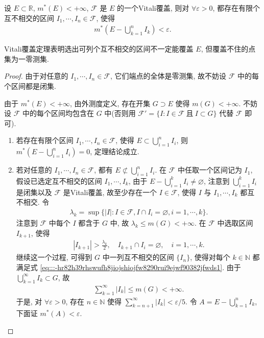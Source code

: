 \documentclass[../../main.tex]{subfiles}%
\begin{document}
\begin{theorem}[Vitali覆盖定理]\label{theorem:Vitali覆盖定理--实变函数}
设 $E\subset\mathbb{R}$, $m^*(E)<+\infty$, $\mathcal{F}$ 是 $E$ 的一个Vitali覆盖, 则对 $\forall\varepsilon>0$, 都存在有限个互不相交的区间 $I_1,\cdots,I_n\in\mathcal{F}$, 使得
\begin{align*}
m^*\!\left(E-\bigcup_{k=1}^n I_k\right)<\varepsilon.
\end{align*}
\end{theorem}
\begin{remark}
Vitali覆盖定理表明选出可列个互不相交的区间不一定能覆盖 $E$, 但覆盖不住的点集为一零测集.
\end{remark}
\begin{proof}

由于对任意的 $I_1,\cdots,I_n\in\mathcal{F}$, 它们端点的全体是零测集, 故不妨设 $\mathcal{F}$ 中的每个区间都是闭集.

由于 $m^*(E)<+\infty$, 由外测度定义, 存在开集 $G\supset E$ 使得 $m(G)<+\infty$. 不妨设 $\mathcal{F}$ 中的每个区间均包含在 $G$ 中(否则用 $\mathcal{F}'=\{I:I\in\mathcal{F}\ \text{且}\ I\subset G\}$ 代替 $\mathcal{F}$ 即可).
\begin{enumerate}[(1)]
\item 若存在有限个区间 $I_1,\cdots,I_n\in\mathcal{F}$, 使得 $E\subset\bigcup_{i=1}^n I_i$, 则 $m^*\!\left(E-\bigcup_{i=1}^n I_i\right)=0$, 定理结论成立.
\item 若对任意的 $I_1,\cdots,I_n\in\mathcal{F}$, 都有 $E\not\subset\bigcup_{i=1}^n I_i$. 在 $\mathcal{F}$ 中任取一个区间记为 $I_1$, 假设已选定互不相交的区间 $I_1,\cdots,I_k$, 由于 $E-\bigcup_{i=1}^k I_i\neq\varnothing $, 注意到 $\bigcup_{i=1}^k I_i$ 是闭集以及 $\mathcal{F}$ 是Vitali覆盖, 故至少存在一个 $I\in\mathcal{F}$, 使得 $I$ 与 $I_1,\cdots,I_k$ 都互不相交. 令
\begin{align*}
\lambda_k=\sup\{|I|:I\in\mathcal{F}, I\cap I_i=\varnothing , i=1,\cdots,k\}.
\end{align*}
注意到 $\mathcal{F}$ 中每个 $I$ 都含于 $G$ 中, 故 $\lambda_k\leqslant m(G)<+\infty$. 在 $\mathcal{F}$ 中选取区间 $I_{k+1}$, 使得
\begin{align}
|I_{k+1}|>\frac{\lambda_k}{2},\quad I_{k+1}\cap I_i=\varnothing ,\quad i=1,\cdots,k.\label{eq:::-hr82h39rhswufh8jiojshiojfw8290rui9ejwf90382jfwds1}
\end{align}
继续这一个过程, 可得到 $G$ 中一列互不相交的区间 $\{I_n\}$, 使得对每个 $k\in\mathbb{N}$ 都满足式 \eqref{eq:::-hr82h39rhswufh8jiojshiojfw8290rui9ejwf90382jfwds1}. 由于 $\bigcup_{k=1}^\infty I_k\subset G$, 故
\begin{align}
\sum_{k=1}^\infty|I_k|\leqslant m(G)<+\infty.\label{eq:::-hr82h39rhswufh8jiojshiojfw8290rui9ejwf90382jfwds2}
\end{align}
于是, 对 $\forall\varepsilon>0$, 存在 $n\in\mathbb{N}$ 使得 $\sum_{k=n+1}^\infty|I_k|<\varepsilon/5$. 令 $A=E-\bigcup_{k=1}^n I_k$, 下面证 $m^*(A)<\varepsilon$.


\end{enumerate}
\end{proof}
\end{document}
